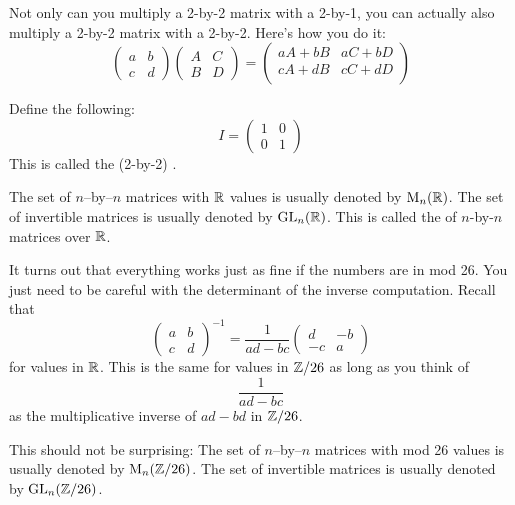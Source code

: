 Not only can you multiply a 2-by-2 matrix
with a 2-by-1, you can actually also multiply
a 2-by-2 matrix
with a 2-by-2.
Here's how you do it:
\[
\begin{pmatrix}
  a & b \\
  c & d 
\end{pmatrix}
\begin{pmatrix}
  A & C \\
  B & D 
\end{pmatrix}
=
\begin{pmatrix}
  aA + bB &   aC + bD \\
  cA + dB &   cC + dD \\
\end{pmatrix}
\]




Define the following:
  \[
  I =
  \begin{pmatrix}
    1 & 0 \\
    0 & 1 
  \end{pmatrix}
  \]
  This is called the
  (2-by-2)
  .





The set of $n$--by--$n$ matrices with $\mathbb R$ values is usually denoted by
$\operatorname{M}_{n}(\mathbb R)$.
The set of invertible matrices is usually denoted by
$\operatorname{GL}_{n}(\mathbb R)$. This is called the
 of $n$-by-$n$ matrices over $\mathbb R$.

It turns out that everything works just as fine if the numbers are
in mod 26.
You just need to be careful with the determinant of the inverse
computation.
Recall that
\[
\begin{pmatrix}
  a & b \\
  c & d 
\end{pmatrix}^{-1}
=
\frac{1}{ad - bc}
\begin{pmatrix}
  d & -b \\
  -c & a 
\end{pmatrix}
\]
for values in $\mathbb R$.
This is the same for values in $\mathbb Z/26$ as long as you think of
\[
\frac{1}{ad - bc}
\]
as the multiplicative inverse of $ad - bd$ in $\mathbb Z/26$.




This should not be surprising:
The set of $n$--by--$n$ matrices with mod 26 values is usually denoted by
$\operatorname{M}_{n}(\mathbb Z/26)$.
The set of invertible matrices is usually denoted by
$\operatorname{GL}_{n}(\mathbb Z/26)$.

